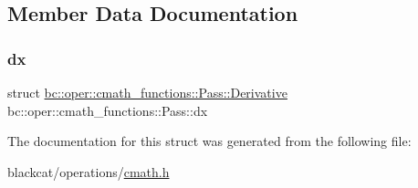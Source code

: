\subsection{Member Data Documentation}
\mbox{\label{structbc_1_1oper_1_1cmath__functions_1_1Pass_a0c0edf33f98149fe35116563ecb3ca52}} 
\subsubsection{\texorpdfstring{dx}{dx}}
{\footnotesize\ttfamily struct \hyperlink{structbc_1_1oper_1_1cmath__functions_1_1Pass_1_1Derivative}{bc\+::oper\+::cmath\+\_\+functions\+::\+Pass\+::\+Derivative}   bc\+::oper\+::cmath\+\_\+functions\+::\+Pass\+::dx}



The documentation for this struct was generated from the following file\+:\begin{DoxyCompactItemize}
\item 
blackcat/operations/\hyperlink{cmath_8h}{cmath.\+h}\end{DoxyCompactItemize}
